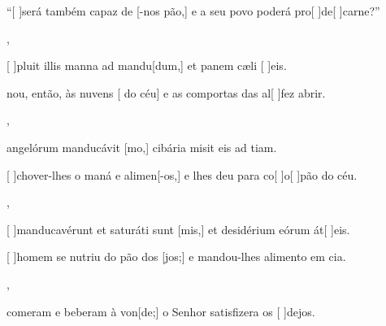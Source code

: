 {    {\item {}``[ ]{se}rá também capaz de [-nos pão,] e a seu povo poderá pro[ ]{de}[ ]{car}ne?''},
  {\item {}[ ]{plu}it illis manna ad mandu[dum,] et panem cæli [ ]{e}is.}%
    {\item {}nou, então, às nuvens [ do céu] e as comportas das al[ ]{fez } abrir.},
  {\item {} angelórum manducávit [mo,] cibária misit eis ad tiam.}%
    {\item {}[ ]{cho}ver-lhes o maná e alimen[-os,] e lhes deu para co[ ]{o}[ ]{pão} do céu.},
  {\item {}[ ]{man}ducavérunt et saturáti sunt [mis,] et desidérium eórum át[ ]{e}is.}%
    {\item {}[ ]{ho}mem se nutriu do pão dos [jos;] e mandou-lhes alimento em cia.},
  {}%
    {\item {} comeram e beberam à von[de;] o Senhor satisfizera os [ ]{de}jos.}
}